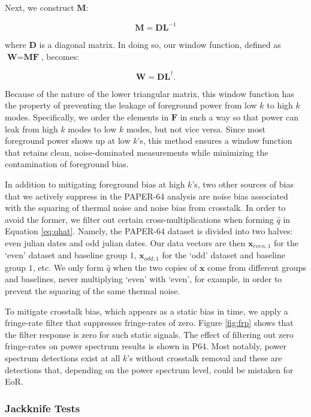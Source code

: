 \documentclass[preprint2,numberedappendix,tighten]{aastex6}  %
\begin{document}
\noindent Next, we construct $\textbf{M}$:

\begin{equation}
\textbf{M} = \textbf{DL}^{-1}
\end{equation}

\noindent where $\textbf{D}$ is a diagonal matrix. In doing so, our window function, defined as $\textbf{W} = \textbf{MF}$, becomes:

\begin{equation}
\textbf{W} = \textbf{DL}^{\dagger}.
\end{equation}

\noindent Because of the nature of the lower triangular matrix, this window function has the property of preventing the leakage of foreground power from low $k$ to high $k$ modes. Specifically, we order the elements in $\textbf{F}$ in such a way so that power can leak from high $k$ modes to low $k$ modes, but not vice versa. Since most foreground power shows up at low $k$'s, this method ensures a window function that retains clean, noise-dominated measurements while minimizing the contamination of foreground bias.

In addition to mitigating foreground bias at high $k$'s, two other sources of bias that we actively suppress in the PAPER-64 analysis are noise bias associated with the squaring of thermal noise and noise bias from crosstalk. In order to avoid the former, we filter out certain cross-multiplications when forming $\hat{q}$ in Equation \eqref{eq:qhat}. Namely, the PAPER-64 dataset is divided into two halves: even julian dates and odd julian dates. Our data vectors are then $\textbf{x}_{even, 1}$ for the `even' dataset and baseline group $1$, $\textbf{x}_{odd, 1}$ for the `odd' dataset and baseline group $1$, etc. We only form $\hat{q}$ when the two copies of $\textbf{x}$ come from different groups and baselines, never multiplying `even' with `even', for example, in order to prevent the squaring of the same thermal noise.

To mitigate crosstalk bias, which appears as a static bias in time, we apply a fringe-rate filter that suppresses fringe-rates of zero. Figure \ref{fig:frp} shows that the filter response is zero for such static signals. The effect of filtering out zero fringe-rates on power spectrum results is shown in P64. Most notably, power spectrum detections exist at all $k$'s without crosstalk removal and these are detections that, depending on the power spectrum level, could be mistaken for EoR. 

\subsubsection{Jackknife Tests}
\end{document}
